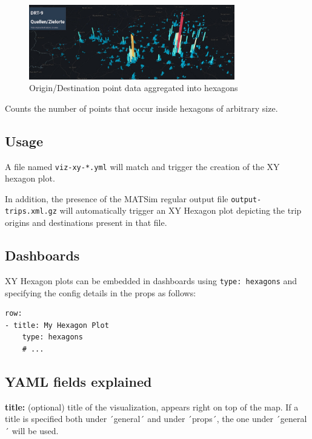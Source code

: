 \begin{figure}[H]
    \centering
    \includegraphics[width=0.8\textwidth]{assets/xy-hexagons.jpg}
    \caption{Origin/Destination point data aggregated into hexagons}
\end{figure}

Counts the number of points that occur inside hexagons of arbitrary size.

\hypertarget{usage}{%
\subsection{Usage}\label{usage}}

A file named \texttt{viz-xy-*.yml} will match and trigger the creation
of the XY hexagon plot.

In addition, the presence of the MATSim regular output file
\texttt{output-trips.xml.gz} will automatically trigger an XY Hexagon
plot depicting the trip origins and destinations present in that file.

\hypertarget{dashboards}{%
\subsection{Dashboards}\label{dashboards}}

XY Hexagon plots can be embedded in dashboards using
\texttt{type:\ hexagons} and specifying the config details in the props
as follows:

\begin{lstlisting}
row:
- title: My Hexagon Plot
    type: hexagons
    # ...
\end{lstlisting}

\hypertarget{yaml-fields-explained}{%
\subsection{YAML fields explained}}

\textbf{title:} (optional) title of the visualization, appears right on
top of the map. If a title is specified both under ´general´ and under
´props´, the one under ´general´ will be used.

